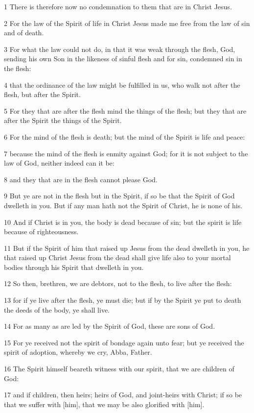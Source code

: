 \par 1 There is therefore now no condemnation to them that are in Christ Jesus.
\par 2 For the law of the Spirit of life in Christ Jesus made me free from the law of sin and of death.
\par 3 For what the law could not do, in that it was weak through the flesh, God, sending his own Son in the likeness of sinful flesh and for sin, condemned sin in the flesh:
\par 4 that the ordinance of the law might be fulfilled in us, who walk not after the flesh, but after the Spirit.
\par 5 For they that are after the flesh mind the things of the flesh; but they that are after the Spirit the things of the Spirit.
\par 6 For the mind of the flesh is death; but the mind of the Spirit is life and peace:
\par 7 because the mind of the flesh is enmity against God; for it is not subject to the law of God, neither indeed can it be:
\par 8 and they that are in the flesh cannot please God.
\par 9 But ye are not in the flesh but in the Spirit, if so be that the Spirit of God dwelleth in you. But if any man hath not the Spirit of Christ, he is none of his.
\par 10 And if Christ is in you, the body is dead because of sin; but the spirit is life because of righteousness.
\par 11 But if the Spirit of him that raised up Jesus from the dead dwelleth in you, he that raised up Christ Jesus from the dead shall give life also to your mortal bodies through his Spirit that dwelleth in you.
\par 12 So then, brethren, we are debtors, not to the flesh, to live after the flesh:
\par 13 for if ye live after the flesh, ye must die; but if by the Spirit ye put to death the deeds of the body, ye shall live.
\par 14 For as many as are led by the Spirit of God, these are sons of God.
\par 15 For ye received not the spirit of bondage again unto fear; but ye received the spirit of adoption, whereby we cry, Abba, Father.
\par 16 The Spirit himself beareth witness with our spirit, that we are children of God:
\par 17 and if children, then heirs; heirs of God, and joint-heirs with Christ; if so be that we suffer with [him], that we may be also glorified with [him].
